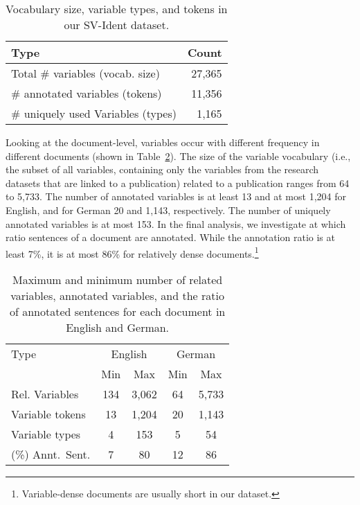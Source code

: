 \documentclass[11pt]{article}
\begin{document}
\begin{table}[]
    \centering
    \begin{tabular}{l|r}
        Type & Count  \\
        \hline
        \hline
        Total \# variables (vocab. size)  & 27,365 \\
        \hline
        \# annotated variables (tokens) & 11,356 \\
        \# uniquely used Variables (types) & 1,165\\
        \hline
    \end{tabular}
    \caption{Vocabulary size, variable types, and tokens in our SV-Ident dataset.}
    \label{tab:var_stats}
\end{table}

Looking at the document-level, variables occur with different frequency in different documents (shown in Table~\ref{tab:var_distr}).
The size of the variable vocabulary (i.e., the subset of all variables, containing only the variables from the research datasets that are linked to a publication) related to a publication ranges from 64 to 5,733.
The number of annotated variables is at least 13 and at most 1,204 for English, and for German 20 and 1,143, respectively.
The number of uniquely annotated variables is at most 153.
In the final analysis, we investigate at which ratio sentences of a document are annotated.
While the annotation ratio is at least 7\%, it is at most 86\% for relatively dense documents.\footnote{Variable-dense documents are usually short in our dataset.}

\begin{table}[]

    \centering
    \begin{tabular}{l|c|c|c|c}
         Type & \multicolumn{2}{c|}{English} & \multicolumn{2}{c}{German} \\\cline{2-5}
         & Min & Max & Min & Max \\
        \hline
        \hline
        Rel. Variables & 134 & 3,062  & 64 & 5,733\\
        \hline
        Variable tokens & 13 & 1,204  &  20 & 1,143\\
        Variable types & 4 & 153  & 5 & 54\\
        \hline
        (\%) Annt.\ Sent. & 7 & 80  & 12 & 86\\
        \hline
    \end{tabular}
    \caption{Maximum and minimum number of related variables, annotated variables, and the ratio of annotated sentences for each document in English and German.}
    \label{tab:var_distr}
\end{table}
\end{document}
